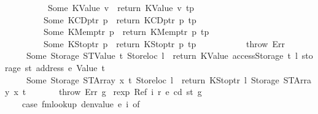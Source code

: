 \begin{isabellebody}
\ \ \ \ \ \ \ \ \ \ Some\ {\isacharparenleft}{\kern0pt}KValue\ v{\isacharparenright}{\kern0pt}\ {\isasymRightarrow}\ return\ {\isacharparenleft}{\kern0pt}KValue\ v{\isacharcomma}{\kern0pt}\ tp{\isacharparenright}{\kern0pt}\isanewline
\ \ \ \ \ \ \ \ {\isacharbar}{\kern0pt}\ Some\ {\isacharparenleft}{\kern0pt}KCDptr\ p{\isacharparenright}{\kern0pt}\ {\isasymRightarrow}\ return\ {\isacharparenleft}{\kern0pt}KCDptr\ p{\isacharcomma}{\kern0pt}\ tp{\isacharparenright}{\kern0pt}\isanewline
\ \ \ \ \ \ \ \ {\isacharbar}{\kern0pt}\ Some\ {\isacharparenleft}{\kern0pt}KMemptr\ p{\isacharparenright}{\kern0pt}\ {\isasymRightarrow}\ return\ {\isacharparenleft}{\kern0pt}KMemptr\ p{\isacharcomma}{\kern0pt}\ tp{\isacharparenright}{\kern0pt}\isanewline
\ \ \ \ \ \ \ \ {\isacharbar}{\kern0pt}\ Some\ {\isacharparenleft}{\kern0pt}KStoptr\ p{\isacharparenright}{\kern0pt}\ {\isasymRightarrow}\ return\ {\isacharparenleft}{\kern0pt}KStoptr\ p{\isacharcomma}{\kern0pt}\ tp{\isacharparenright}{\kern0pt}\isanewline
\ \ \ \ \ \ \ \ {\isacharbar}{\kern0pt}\ {\isacharunderscore}{\kern0pt}\ {\isasymRightarrow}\ throw\ Err{\isacharparenright}{\kern0pt}\isanewline
\ \ \ \ {\isacharbar}{\kern0pt}\ Some\ {\isacharparenleft}{\kern0pt}Storage\ {\isacharparenleft}{\kern0pt}STValue\ t{\isacharparenright}{\kern0pt}{\isacharcomma}{\kern0pt}\ Storeloc\ l{\isacharparenright}{\kern0pt}\ {\isasymRightarrow}\ return\ {\isacharparenleft}{\kern0pt}KValue\ {\isacharparenleft}{\kern0pt}accessStorage\ t\ l\ {\isacharparenleft}{\kern0pt}storage\ st\ {\isacharparenleft}{\kern0pt}address\ e{\isacharparenright}{\kern0pt}{\isacharparenright}{\kern0pt}{\isacharparenright}{\kern0pt}{\isacharcomma}{\kern0pt}\ Value\ t{\isacharparenright}{\kern0pt}\isanewline
\ \ \ \ {\isacharbar}{\kern0pt}\ Some\ {\isacharparenleft}{\kern0pt}Storage\ {\isacharparenleft}{\kern0pt}STArray\ x\ t{\isacharparenright}{\kern0pt}{\isacharcomma}{\kern0pt}\ Storeloc\ l{\isacharparenright}{\kern0pt}\ {\isasymRightarrow}\ return\ {\isacharparenleft}{\kern0pt}KStoptr\ l{\isacharcomma}{\kern0pt}\ Storage\ {\isacharparenleft}{\kern0pt}STArray\ x\ t{\isacharparenright}{\kern0pt}{\isacharparenright}{\kern0pt}\isanewline
\ \ \ \ {\isacharbar}{\kern0pt}\ {\isacharunderscore}{\kern0pt}\ {\isasymRightarrow}\ throw\ Err{\isacharparenright}{\kern0pt}\ g{\isachardoublequoteclose}\isanewline
{\isacharbar}{\kern0pt}\ {\isachardoublequoteopen}rexp\ {\isacharparenleft}{\kern0pt}Ref\ i\ r{\isacharparenright}{\kern0pt}\ e\ cd\ st\ g\ {\isacharequal}{\kern0pt}\isanewline
\ \ \ \ {\isacharparenleft}{\kern0pt}case\ fmlookup\ {\isacharparenleft}{\kern0pt}denvalue\ e{\isacharparenright}{\kern0pt}\ i\ of\isanewline

\end{isabellebody}
